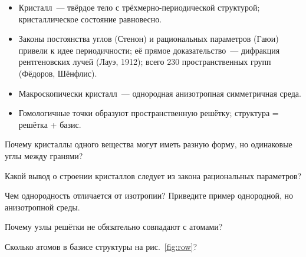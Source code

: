 \begin{itogi}
\begin{itemize}
\item Кристалл~— твёрдое тело с трёхмерно-периодической структурой;
кристаллическое состояние равновесно.
\item Законы постоянства углов (Стенон) и рациональных параметров (Гаюи)
привели к идее периодичности; её прямое доказательство~— дифракция
рентгеновских лучей (Лауэ, 1912); всего 230 пространственных групп
(Фёдоров, Шёнфлис).
\item Макроскопически кристалл~— однородная анизотропная симметричная
среда.
\item Гомологичные точки образуют пространственную решётку; структура =
решётка + базис.
\end{itemize}
\end{itogi}

\begin{proverka}
\item Почему кристаллы одного вещества могут иметь разную форму, но
одинаковые углы между гранями?
\item Какой вывод о строении кристаллов следует из закона рациональных
параметров?
\item Чем однородность отличается от изотропии? Приведите пример
однородной, но анизотропной среды.
\item Почему узлы решётки не обязательно совпадают с атомами?
\item Сколько атомов в базисе структуры на рис.~\ref{fig:row}?
\end{proverka}
